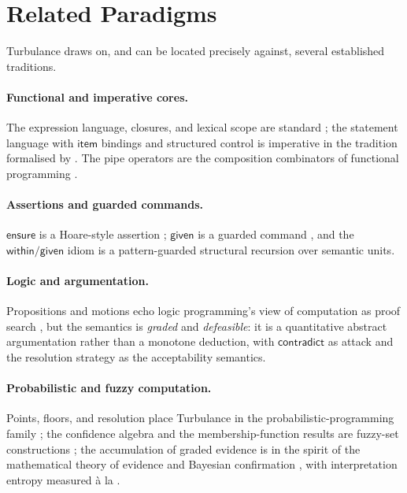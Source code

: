 \documentclass[11pt,a4paper]{article}
\theoremstyle{plain}
\theoremstyle{definition}
\theoremstyle{remark}
\begin{document}
\section{Related Paradigms}
\label{sec:related}

Turbulance draws on, and can be located precisely against, several established
traditions.

\paragraph{Functional and imperative cores.} The expression language, closures,
and lexical scope are standard \citep{landin1966,church1940,barendregt1984};
the statement language with $\mathsf{item}$ bindings and structured control is
imperative in the tradition formalised by \citet{winskel1993}. The pipe
operators are the composition combinators of functional programming
\citep{wadler1992}.

\paragraph{Assertions and guarded commands.} $\mathsf{ensure}$ is a Hoare-style
assertion \citep{hoare1969}; $\mathsf{given}$ is a guarded command
\citep{dijkstra1975}, and the $\mathsf{within}/\mathsf{given}$ idiom is a
pattern-guarded structural recursion over semantic units.

\paragraph{Logic and argumentation.} Propositions and motions echo logic
programming's view of computation as proof search \citep{kowalski1974}, but the
semantics is \emph{graded} and \emph{defeasible}: it is a quantitative abstract
argumentation \citep{dung1995,besnard2008,toulmin1958} rather than a monotone
deduction, with $\mathsf{contradict}$ as attack and the resolution strategy as
the acceptability semantics.

\paragraph{Probabilistic and fuzzy computation.} Points, floors, and resolution
place Turbulance in the probabilistic-programming family \citep{kozen1981,
goodman2008,gordon2014,mciver2005}; the confidence algebra and the
membership-function results are fuzzy-set constructions \citep{zadeh1965,
hajek1998}; the accumulation of graded evidence is in the spirit of the
mathematical theory of evidence \citep{shafer1976,dempster1967} and Bayesian
confirmation \citep{cox1946,jaynes2003,pearl1988}, with interpretation entropy
measured \`a la \citet{shannon1948}.
\end{document}
